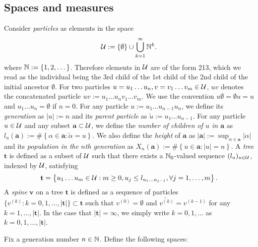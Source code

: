 \documentclass[12pt]{amsart}
\numberwithin{equation}{section}
\newcommand{\defn}[1]{{\em #1}}
\newcommand{\abs}[1]{\left| #1 \right|}
\newcommand{\set}[1]{\left\{ #1 \right\}}
\newcommand{\parent}[1]{\overleftarrow{#1}}
\newcommand{\tree}{\mathbf t}
\newcommand{\spine}{\mathbf v}
\begin{document}
\subsection{Spaces and measures}
\label{sec:spacesandmeasures}
	Consider \defn{particles} as elements in the space
\begin{equation*}
		\cU
	:=
		\set{\emptyset}\cup\bigcup_{k=1}^\infty \bbN^k.
\end{equation*}
	where
		$\mathbb N:=\{1,2,\dots\}$.
	Therefore elements in $\mathcal U$ are of the form 213, which we read as the individual being the 3rd child of the 1st child of the 2nd child of the initial ancestor $\emptyset$.
	For two particles
		$u=u_1\dots u_n, v=v_1\dots v_m\in\mathcal U$,
	$uv$ denotes the concatenated particle
		$uv:=u_1\dots u_nv_1\dots v_m$.
	We use the convention $u\emptyset = \emptyset u = u$
		and $u_1\dots u_n=\emptyset$ if $n=0$.
	For any particle
		$u:=u_1\dots u_{n-1}u_n$, we define its \defn{generation} as $\abs{u}:=n$ and its \defn{parent particle} as
		$\parent{u}:=u_1\dots u_{n-1}$.
	For any particle $u\in\mathcal U$ and any subset $\mathbf a\subset\mathcal U$, we define the
		\defn{number of children of $u$ in $\mathbf a$}
	as $l_u(\mathbf a) := \#\set{\alpha\in \mathbf a:\parent{\alpha}=u} $.
	We also define the \defn{height} of $\mathbf a$ as $|\mathbf a|:=\sup_{\alpha\in \mathbf a}|\alpha|$ and its \defn{population in the $n$th generation} as $X_n(\mathbf a):=\#\set{u\in \mathbf a:|u|=n}$.
	A \defn{tree} $\tree$ is defined as a subset of $\mathcal U$ such that there exists a $\mathbb N_0$-valued sequence $(l_u)_{u\in \mathcal U}$, indexed by $\mathcal U$, satisfying
\begin{equation*}
		\tree
	=
                 \set{u_1\dots u_m\in \cU: m\ge 0, u_j\leq l_{u_1\dots u_{j-1}}, \forall  j=1,\dots,m}.
\end{equation*}
	A \defn{spine} $\spine$ on a  tree $\tree$ is defined as a sequence of particles
		 $\{v^{(k)}:k=0,1,\dots,|\tree|\}\subset\tree$
	such that $v^{(0)}=\emptyset$ and $\parent{v^{(k)}}=v^{(k-1)}$ for any %
	$k=1,\dots, |\tree|$.
	In the case that $|\tree|=\infty$, we simply write $k=0,1,\dots$ as $k=0,1,\dots, |\tree|$.
\par
	Fix a generation number $n\in \mathbb N$. Define the following spaces:
\end{document}
